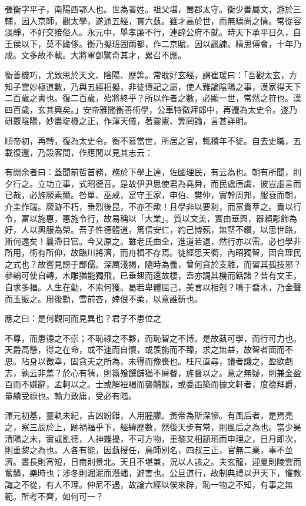 
\begin{pinyinscope}
張衡字平子，南陽西鄂人也。世為著姓。祖父堪，蜀郡太守。衡少善屬文，游於三輔，因入京師，觀太學，遂通五經，貫六蓺。雖才高於世，而無驕尚之情。常從容淡靜，不好交接俗人。永元中，舉孝廉不行，連辟公府不就。時天下承平日久，自王侯以下，莫不踰侈。衡乃擬班固兩都，作二京賦，因以諷諫。精思傅會，十年乃成。文多故不載。大將軍鄧騭奇其才，累召不應。

衡善機巧，尤致思於天文、陰陽、歷筭。常耽好玄經，謂崔瑗曰：「吾觀太玄，方知子雲妙極道數，乃與五經相擬，非徒傳記之屬，使人難論陰陽之事，漢家得天下二百歲之書也。復二百歲，殆將終乎？所以作者之數，必顯一世，常然之符也。漢四百歲，玄其興矣。」安帝雅聞衡善術學，公車特徵拜郎中，再遷為太史令。遂乃研覈陰陽，妙盡琁機之正，作渾天儀，著靈憲、筭罔論，言甚詳明。

順帝初，再轉，復為太史令。衡不慕當世，所居之官，輒積年不徙。自去史職，五載復還，乃設客問，作應閒以見其志云：

有閒余者曰：蓋聞前哲首務，務於下學上達，佐國理民，有云為也。朝有所聞，則夕行之。立功立事，式昭德音。是故伊尹思使君為堯舜，而民處唐虞，彼豈虛言而已哉，必旌厥素爾。咎單、巫咸，寔守王家，申伯、樊仲，實幹周邦，服袞而朝，介圭作瑞。厥跡不朽，垂烈後昆，不亦丕歟！且學非以要利，而富貴萃之。貴以行令，富以施惠，惠施令行，故易稱以「大業」。質以文美，實由華興，器賴彫飾為好，人以輿服為榮。吾子性德體道，篤信安仁，約己博蓺，無堅不鑽，以思世路，斯何遠矣！曩滯日官。今又原之。雖老氏曲全，進道若退，然行亦以需。必也學非所用，術有所仰，故臨川將濟，而舟楫不存焉。徒經思天衢，內昭獨智，固合理民之式也？故嘗見謗于鄙儒。深厲淺揭，隨時為義，曾何貪於支離，而習其孤技邪？參輪可使自轉，木雕猶能獨飛，已垂翅而還故棲，盍亦調其機而銛諸？昔有文王，自求多福。人生在勤，不索何獲。曷若卑體屈己，美言以相剋？鳴于喬木，乃金聲而玉振之。用後勳，雪前吝，婞佷不柔，以意誰靳也。

應之曰：是何觀同而見異也？君子不患位之

不尊，而患德之不崇；不恥祿之不夥，而恥智之不博。是故蓺可學，而行可力也。天爵高懸，得之在命，或不速而自懷，或羨旃而不臻，求之無益，故智者面而不思。阽身以徼幸，固貪夫之所為，未得而豫喪也。枉尺直尋，議者譏之，盈欲虧志，孰云非羞？於心有猜，則簋飧饌餔猶不屑餐，旌瞀以之。意之無疑，則兼金盈百而不嫌辭，孟軻以之。士或解裋褐而襲黼黻，或委臿築而據文軒者，度德拜爵，量績受祿也。輸力致庸，受必有階。

渾元初基，靈軌未紀，吉凶紛錯，人用朣朦。黃帝為斯深慘。有風后者，是焉亮之，察三辰於上，跡禍福乎下，經緯歷數，然後天步有常，則風后之為也。當少昊清陽之末，實或亂德，人神雜擾，不可方物，重黎又相顓頊而申理之，日月即次，則重黎之為也。人各有能，因蓺授任，鳥師別名，四叔三正，官無二業，事不並濟。晝長則宵短，日南則景北。天且不堪兼，況以人該之。夫玄龍，迎夏則陵雲而奮鱗，樂時也；涉冬則淈泥而潛蟠，避害也。公旦道行，故制典禮以尹天下，懼教誨之不從，有人不理。仲尼不遇，故論六經以俟來辟，恥一物之不知，有事之無範。所考不齊，如何可一？


\end{pinyinscope}
